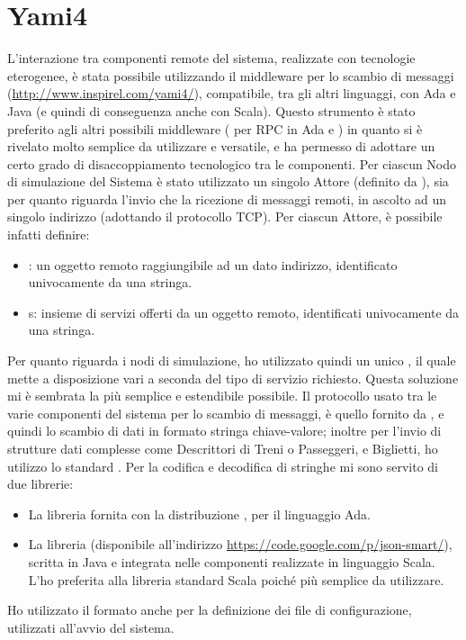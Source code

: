 	\section{Yami4}
L'interazione tra componenti remote del sistema, realizzate con tecnologie eterogenee, è stata possibile utilizzando il middleware per lo scambio di messaggi  (\url{http://www.inspirel.com/yami4/}), compatibile, tra gli altri linguaggi, con Ada e Java (e quindi di conseguenza anche con Scala). Questo strumento è stato preferito agli altri possibili middleware ( per RPC in Ada e ) in quanto si è rivelato molto semplice da utilizzare e versatile, e ha permesso di adottare un certo grado di disaccoppiamento tecnologico tra le componenti. Per ciascun Nodo di simulazione del Sistema è stato utilizzato un singolo Attore (definito da ), sia per quanto riguarda l'invio che la ricezione di messaggi remoti, in ascolto ad un singolo indirizzo (adottando il protocollo TCP). Per ciascun Attore, è possibile infatti definire:
	\begin{itemize}
		\item {}: un oggetto remoto raggiungibile ad un dato indirizzo, identificato univocamente da una stringa.
		\item {}s: insieme di servizi offerti da un oggetto remoto, identificati univocamente da una stringa.
	\end{itemize}
Per quanto riguarda i nodi di simulazione, ho utilizzato quindi un unico , il quale mette a disposizione vari  a seconda del tipo di servizio richiesto. Questa soluzione mi è sembrata la più semplice e estendibile possibile.
Il protocollo usato tra le varie componenti del sistema per lo scambio di messaggi, è quello fornito da , e quindi lo scambio di dati in formato stringa chiave-valore; inoltre per l'invio di strutture dati complesse come Descrittori di Treni o Passeggeri, e Biglietti, ho utilizzo lo standard . Per la codifica e decodifica di stringhe  mi sono servito di due librerie:
	\begin{itemize}
		\item La libreria  fornita con la distribuzione , per il linguaggio Ada.
		\item La libreria  (disponibile all'indirizzo \url{https://code.google.com/p/json-smart/}), scritta in Java e integrata nelle componenti realizzate in linguaggio Scala. L'ho preferita alla libreria standard Scala  poiché più semplice da utilizzare.
		
	\end{itemize}
	Ho utilizzato il formato  anche per la definizione dei file di configurazione, utilizzati all'avvio del sistema.



